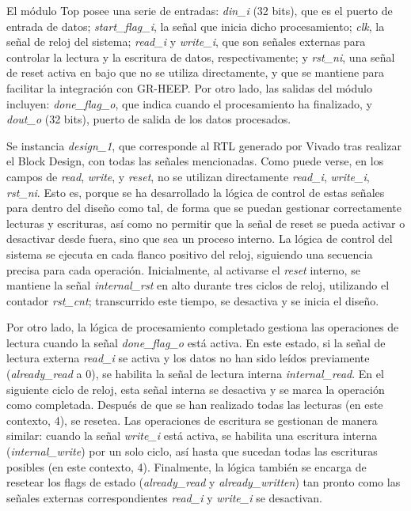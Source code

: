El módulo Top posee una serie de entradas: \emph{din\_i} (32 bits), que es el puerto de entrada de datos; \emph{start\_flag\_i}, la señal que inicia dicho procesamiento; \emph{clk}, la señal de reloj del sistema; \emph{read\_i} y \emph{write\_i}, que son señales externas para controlar la lectura y la escritura de datos, respectivamente; y \emph{rst\_ni}, una señal de reset activa en bajo que no se utiliza directamente, y que se mantiene para facilitar la integración con GR-HEEP. Por otro lado, las salidas del módulo incluyen: \emph{done\_flag\_o}, que indica cuando el procesamiento ha finalizado, y \emph{dout\_o} (32 bits), puerto de salida de los datos procesados.

Se instancia \emph{design\_1}, que corresponde al RTL generado por Vivado tras realizar el Block Design, con todas las señales mencionadas. Como puede verse, en los campos de \emph{read}, \emph{write}, y \emph{reset}, no se utilizan directamente \emph{read\_i}, \emph{write\_i}, \emph{rst\_ni}. Esto es, porque se ha desarrollado la lógica de control de estas señales para dentro del diseño como tal, de forma que se puedan gestionar correctamente lecturas y escrituras, así como no permitir que la señal de reset se pueda activar o desactivar desde fuera, sino que sea un proceso interno. La lógica de control del sistema se ejecuta en cada flanco positivo del reloj, siguiendo una secuencia precisa para cada operación. Inicialmente, al activarse el \emph{reset} interno, se mantiene la señal \emph{internal\_rst} en alto durante tres ciclos de reloj, utilizando el contador \emph{rst\_cnt}; transcurrido este tiempo,  se desactiva y se inicia el diseño. 

Por otro lado, la lógica de procesamiento completado gestiona las operaciones de lectura cuando la señal \emph{done\_flag\_o} está activa. En este estado, si la señal de lectura externa \emph{read\_i} se activa y los datos no han sido leídos previamente (\emph{already\_read} a 0), se habilita la señal de lectura interna \emph{internal\_read}. En el siguiente ciclo de reloj, esta señal interna se desactiva y se marca la operación como completada. Después de que se han realizado todas las lecturas (en este contexto, 4), se resetea. Las operaciones de escritura se gestionan de manera similar: cuando la señal \emph{write\_i} está activa, se habilita una escritura interna (\emph{internal\_write}) por un solo ciclo, así hasta que sucedan todas las escrituras posibles (en este contexto, 4). Finalmente, la lógica también se encarga de resetear los flags de estado (\emph{already\_read} y \emph{already\_written}) tan pronto como las señales externas correspondientes \emph{read\_i} y \emph{write\_i} se desactivan.

